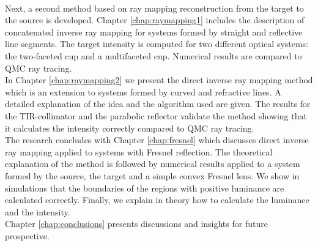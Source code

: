\\ \indent Next, a second method based on ray mapping reconstruction from the target to the source is developed. Chapter \ref{chap:raymapping1} includes the description of concatenated inverse ray mapping for systems formed by straight and reflective line segments. The target intensity is computed for two different optical systems: the two-faceted cup and a multifaceted cup. Numerical results are compared to QMC ray tracing. \\ \indent 
In Chapter \ref{chap:raymapping2} we present the direct inverse ray mapping method which is an extension to systems formed by curved and refractive lines. A detailed explanation of the idea and the algorithm used are given. The results for the TIR-collimator and the parabolic reflector validate the method showing that it calculates the intensity correctly compared to QMC ray tracing. \\ \indent
The research concludes with Chapter \ref{chap:fresnel} which discusses direct inverse ray mapping applied to systems with Fresnel reflection. The theoretical explanation of the method is followed by numerical results applied to a system formed by the source, the target and a simple convex Fresnel lens. We show in simulations that the boundaries of the regions with positive luminance are calculated correctly. Finally, we explain in theory how to calculate the luminance and the intensity. \\ \indent Chapter \ref{chap:conclusions} presents discussions and insights for future prospective.
\clearpage{\pagestyle{empty}\cleardoublepage}
 